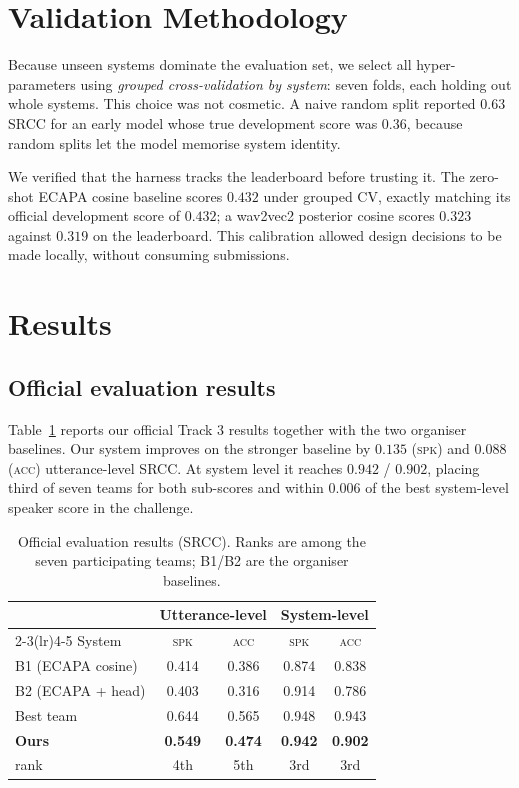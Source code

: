 \documentclass{article}
\begin{document}
\section{Validation Methodology}

Because unseen systems dominate the evaluation set, we select all
hyper-parameters using \emph{grouped cross-validation by system}: seven folds,
each holding out whole systems. This choice was not cosmetic. A naive random
split reported $0.63$ SRCC for an early model whose true development score was
$0.36$, because random splits let the model memorise system identity.

We verified that the harness tracks the leaderboard before trusting it. The
zero-shot ECAPA cosine baseline scores $0.432$ under grouped CV, exactly matching
its official development score of $0.432$; a wav2vec2 posterior cosine scores
$0.323$ against $0.319$ on the leaderboard. This calibration allowed design
decisions to be made locally, without consuming submissions.

\section{Results}
\label{sec:results}

\subsection{Official evaluation results}

Table~\ref{tab:eval} reports our official Track 3 results together with the two
organiser baselines. Our system improves on the stronger baseline by $0.135$
(\textsc{spk}) and $0.088$ (\textsc{acc}) utterance-level SRCC. At system level
it reaches $0.942$ / $0.902$, placing third of seven teams for both sub-scores
and within $0.006$ of the best system-level speaker score in the challenge.

\begin{table}[t]
\centering
\caption{Official evaluation results (SRCC). Ranks are among the seven
participating teams; B1/B2 are the organiser baselines.}
\label{tab:eval}
\small
\begin{tabular}{lcccc}
\toprule
 & \multicolumn{2}{c}{Utterance-level} & \multicolumn{2}{c}{System-level} \\
\cmidrule(lr){2-3}\cmidrule(lr){4-5}
System & \textsc{spk} & \textsc{acc} & \textsc{spk} & \textsc{acc} \\
\midrule
B1 (ECAPA cosine)      & 0.414 & 0.386 & 0.874 & 0.838 \\
B2 (ECAPA + head)      & 0.403 & 0.316 & 0.914 & 0.786 \\
Best team              & 0.644 & 0.565 & 0.948 & 0.943 \\
\midrule
\textbf{Ours}          & \textbf{0.549} & \textbf{0.474}
                       & \textbf{0.942} & \textbf{0.902} \\
\quad rank             & 4th & 5th & 3rd & 3rd \\
\bottomrule
\end{tabular}
\end{table}
\end{document}

